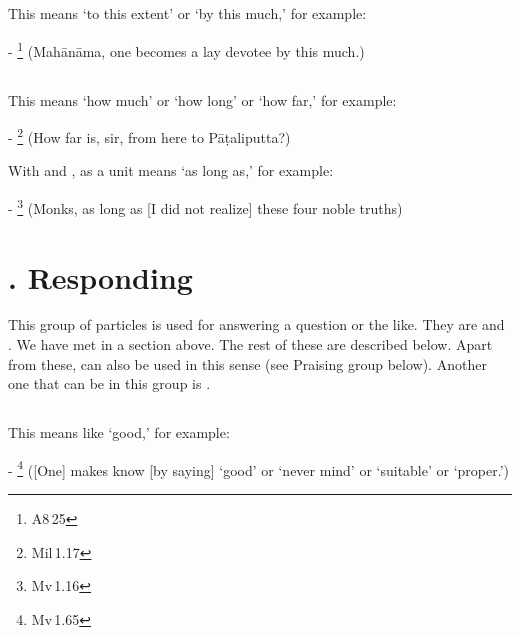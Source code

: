 \subsection*{}\label{nip:ettaavataa}
This means `to this extent' or `by this much,' for example:\par
- \footnote{A8\,25} (Mah\=an\=ama, one becomes a lay devotee by this much.) \par

\subsection*{}\label{nip:kiiva}
This means `how much' or `how long' or `how far,' for example:\par
- \footnote{Mil\,1.17} (How far is, sir, from here to P\=a\d taliputta?) \par
With  and ,  as a unit means `as long as,' for example:\par
- \footnote{Mv\,1.16} (Monks, as long as [I did not realize] these four noble truths) \par

\label{nipgrp10}
\section*{. Responding}\label{nip:resp}

This group of particles is used for answering a question or the like. They are  and . We have met  in a section above. The rest of these are described below. Apart from these,  can also be used in this sense (see Praising group below). Another one that can be in this group is .

\subsection*{}\label{nip:saahu}
This means like `good,' for example:\par
- \footnote{Mv\,1.65} ([One] makes know [by saying] `good' or `never mind' or `suitable' or `proper.') \par

